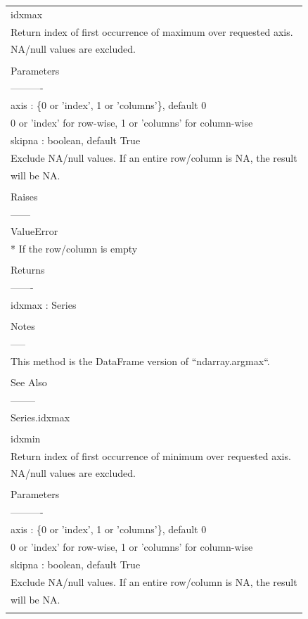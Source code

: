 \documentclass[11pt]{article}
\begin{document}
\begin{enumerate}
\begin{enumerate}
\begin{enumerate}
\begin{center}
\begin{tabular}{l}
idxmax\\
Return index of first occurrence of maximum over requested axis.\\
NA/null values are excluded.\\
\\
Parameters\\
----------\\
axis : \{0 or 'index', 1 or 'columns'\}, default 0\\
0 or 'index' for row-wise, 1 or 'columns' for column-wise\\
skipna : boolean, default True\\
Exclude NA/null values. If an entire row/column is NA, the result\\
will be NA.\\
\\
Raises\\
------\\
ValueError\\
* If the row/column is empty\\
\\
Returns\\
-------\\
idxmax : Series\\
\\
Notes\\
-----\\
This method is the DataFrame version of ``ndarray.argmax``.\\
\\
See Also\\
--------\\
Series.idxmax\\
\\
idxmin\\
Return index of first occurrence of minimum over requested axis.\\
NA/null values are excluded.\\
\\
Parameters\\
----------\\
axis : \{0 or 'index', 1 or 'columns'\}, default 0\\
0 or 'index' for row-wise, 1 or 'columns' for column-wise\\
skipna : boolean, default True\\
Exclude NA/null values. If an entire row/column is NA, the result\\
will be NA.\\
\\

\end{tabular}
\end{center}
\end{enumerate}
\end{enumerate}
\end{enumerate}
\end{document}
